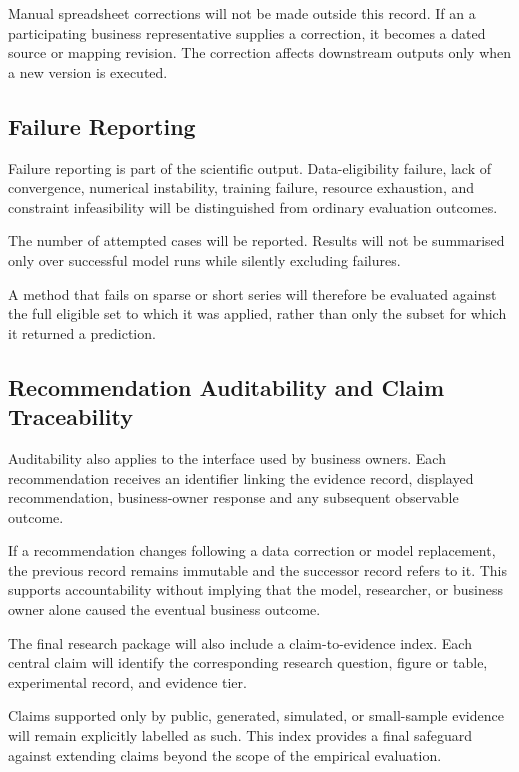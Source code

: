 \documentclass[a4paper,11pt,oneside]{book}
\theoremstyle{plain}
\theoremstyle{definition}
\theoremstyle{remark}
\begin{document}
Manual spreadsheet corrections will not be made outside this record. If an
a participating business representative supplies a correction, it becomes a dated source or mapping revision.
The correction affects downstream outputs only when a new version is executed.


\subsection{Failure Reporting}
\label{subsec:failure_reporting}

Failure reporting is part of the scientific output. Data-eligibility failure,
lack of convergence, numerical instability, training failure, resource
exhaustion, and constraint infeasibility will be distinguished from ordinary
evaluation outcomes.

The number of attempted cases will be reported. Results will not be summarised
only over successful model runs while silently excluding failures.

A method that fails on sparse or short series will therefore be evaluated
against the full eligible set to which it was applied, rather than only the
subset for which it returned a prediction.


\subsection{Recommendation Auditability and Claim Traceability}
\label{subsec:claim_traceability}

Auditability also applies to the interface used by business owners. Each
recommendation receives an identifier linking the evidence record, displayed
recommendation, business-owner response and any subsequent observable outcome.

If a recommendation changes following a data correction or model replacement,
the previous record remains immutable and the successor record refers to it.
This supports accountability without implying that the model, researcher, or
business owner alone caused the eventual business outcome.

The final research package will also include a claim-to-evidence index. Each
central claim will identify the corresponding research question, figure or
table, experimental record, and evidence tier.

Claims supported only by public, generated, simulated, or small-sample evidence
will remain explicitly labelled as such. This index provides a final safeguard
against extending claims beyond the scope of the empirical evaluation.
\end{document}
